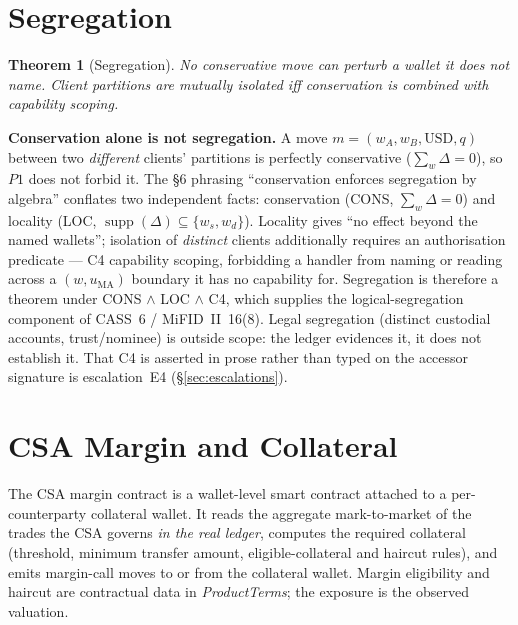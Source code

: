 \documentclass[11pt,a4paper]{article}
\newtheorem{theorem}[definition]{Theorem}
\begin{document}
\section{Segregation}
\label{sec:segregation}

\begin{theorem}[Segregation]
\label{thm:seg}
No conservative move can perturb a wallet it does not name. Client partitions are mutually
isolated \emph{iff} conservation is combined with capability scoping.
\end{theorem}

\noindent\textbf{Conservation alone is not segregation.} A move
$m=(w_{A},w_{B},\text{USD},q)$ between two \emph{different} clients' partitions is perfectly
conservative ($\sum_w\Delta=0$), so $P1$ does not forbid it. The \S 6 phrasing ``conservation
enforces segregation by algebra'' conflates two independent facts: conservation (CONS,
$\sum_w\Delta=0$) and locality (LOC, $\operatorname{supp}(\Delta)\subseteq\{w_s,w_d\}$). Locality
gives ``no effect beyond the named wallets''; isolation of \emph{distinct} clients additionally
requires an authorisation predicate --- C4 capability scoping, forbidding a handler from naming or
reading across a $(w,u_{\mathrm{MA}})$ boundary it has no capability for. Segregation is therefore
a theorem under CONS $\wedge$ LOC $\wedge$ C4, which supplies the logical-segregation component of
CASS~6 / MiFID~II~16(8). Legal segregation (distinct custodial accounts, trust/nominee) is outside
scope: the ledger evidences it, it does not establish it. That C4 is asserted in prose rather than
typed on the accessor signature is escalation~E4 (\S\ref{sec:escalations}).

\section{CSA Margin and Collateral}
\label{sec:csa}

The CSA margin contract is a wallet-level smart contract attached to a per-counterparty collateral
wallet. It reads the aggregate mark-to-market of the trades the CSA governs \emph{in the real
ledger}, computes the required collateral (threshold, minimum transfer amount, eligible-collateral
and haircut rules), and emits margin-call moves to or from the collateral wallet. Margin
eligibility and haircut are contractual data in \textit{ProductTerms}; the exposure is the
observed valuation.
\end{document}
